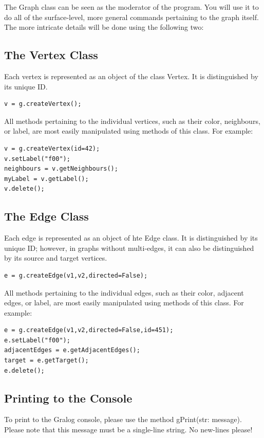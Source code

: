 The Graph class can be seen as the moderator of the program. You will use it to do all of the surface-level, more general commands pertaining to the graph itself. The more intricate details will be done using the following two:

\subsection{The Vertex Class}
Each vertex is represented as an object of the class Vertex. It is distinguished by its unique ID. 

\begin{lstlisting}
v = g.createVertex();
\end{lstlisting}

All methods pertaining to the individual vertices, such as their color, neighbours, or label, are most easily manipulated using methods of this class. For example:

\begin{lstlisting}
v = g.createVertex(id=42);
v.setLabel("f00");
neighbours = v.getNeighbours();
myLabel = v.getLabel();
v.delete();
\end{lstlisting}

\subsection{The Edge Class}
Each edge is represented as an object of hte Edge class. It is distinguished by its unique ID; however, in graphs without multi-edges, it can also be distinguished by its source and target vertices.

\begin{lstlisting}
e = g.createEdge(v1,v2,directed=False);
\end{lstlisting}

All methods pertaining to the individual edges, such as their color, adjacent edges, or label, are most easily manipulated using methods of this class. For example:

\begin{lstlisting}
e = g.createEdge(v1,v2,directed=False,id=451);
e.setLabel("f00");
adjacentEdges = e.getAdjacentEdges();
target = e.getTarget();
e.delete();
\end{lstlisting}

\subsection{Printing to the Console}
To print to the Gralog console, please use the method gPrint(str: message). Please note that this message must be a single-line string. No new-lines please!

